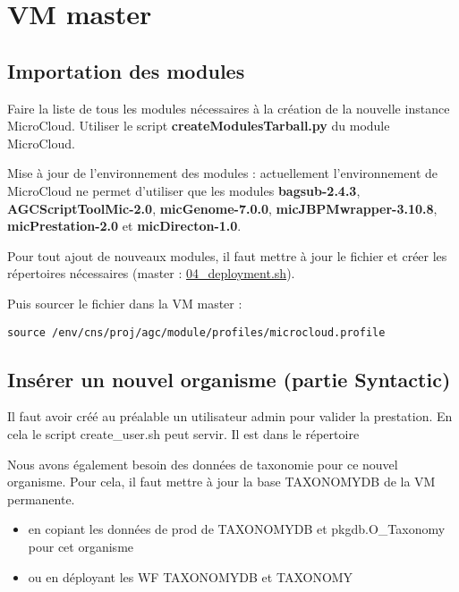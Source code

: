 \section{VM master}

\subsection{Importation des modules}
Faire la liste de tous les modules nécessaires à la création de la nouvelle instance MicroCloud.
Utiliser le script \textbf{createModulesTarball.py} du module MicroCloud.

Mise à jour de l'environnement des modules :
actuellement l'environnement de MicroCloud ne permet d'utiliser que les modules \textbf{bagsub-2.4.3}, \textbf{AGCScriptToolMic-2.0}, \textbf{micGenome-7.0.0}, \textbf{micJBPMwrapper-3.10.8}, \textbf{micPrestation-2.0} et \textbf{micDirecton-1.0}.
\newline

\begin{mycolorbox}
	Pour tout ajout de nouveaux modules, il faut mettre à jour le fichier  et créer les répertoires nécessaires (master : \href{https://github.com/IFB-ElixirFr/biosphere-microcloud/blob/master/master/04_deployment.sh}{04\_deployment.sh}).
\end{mycolorbox}

Puis sourcer le fichier  dans la VM master :
\begin{lstlisting}[style=bash]
source /env/cns/proj/agc/module/profiles/microcloud.profile
\end{lstlisting}

\subsection{Insérer un nouvel organisme (partie Syntactic)}
Il faut avoir créé au préalable un utilisateur admin pour valider la prestation. En cela le script create\_user.sh peut servir.
Il est dans le répertoire 

Nous avons également besoin des données de taxonomie pour ce nouvel organisme. Pour cela, il faut mettre à jour la base TAXONOMYDB de la VM permanente.
\begin{itemize}
    \item en copiant les données de prod de TAXONOMYDB et pkgdb.O\_Taxonomy pour cet organisme
    \item ou en déployant les WF TAXONOMYDB et TAXONOMY
\end{itemize}

